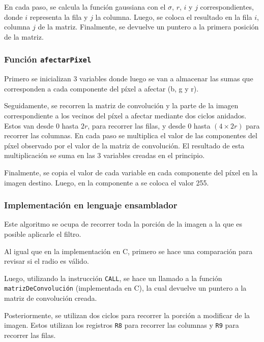         En cada paso, se calcula la función gaussiana con el $\sigma$, $r$, $i$ y $j$ correspondientes, donde $i$ representa la fila y $j$ la columna. Luego, se coloca el resultado en la fila $i$, columna $j$ de la matriz. Finalmente, se devuelve un puntero a la primera posición de la matriz.

      \subsubsection*{Función \texttt{afectarPixel}}
        Primero se inicializan 3 variables donde luego se van a almacenar las sumas que corresponden a cada componente del píxel a afectar (\textsf{b}, \textsf{g} y \textsf{r}). 

        Seguidamente, se recorren la matriz de convolución y la parte de la imagen correspondiente a los vecinos del píxel a afectar mediante dos ciclos anidados. Estos van desde $0$ hasta $2r$, para recorrer las filas, y desde $0$ hasta $(4 \times 2r)$ para recorrer las columnas. En cada paso se multiplica el valor de las componentes del píxel observado por el valor de la matriz de convolución. El resultado de esta multiplicación se suma en las 3 variables creadas en el principio. 
        
        Finalmente, se copia el valor de cada variable en cada componente del píxel en la imagen destino. Luego, en la componente \textsf{a} se coloca el valor 255.  

    \subsubsection{Implementación en lenguaje ensamblador} 
      Este algoritmo se ocupa de recorrer toda la porción de la imagen a la que es posible aplicarle el filtro. 
      
      Al igual que en la implementación en C, primero se hace una comparación para revisar si el radio es válido. 
      
      Luego, utilizando la instrucción \texttt{CALL}, se hace un llamado a la función \texttt{matrizDeConvolución} (implementada en C), la cual devuelve un puntero a la matriz de convolución creada. 
      
      Posteriormente, se utilizan dos ciclos para recorrer la porción a modificar de la imagen. Estos utilizan los registros \texttt{R8} para recorrer las columnas y \texttt{R9} para recorrer las filas.


